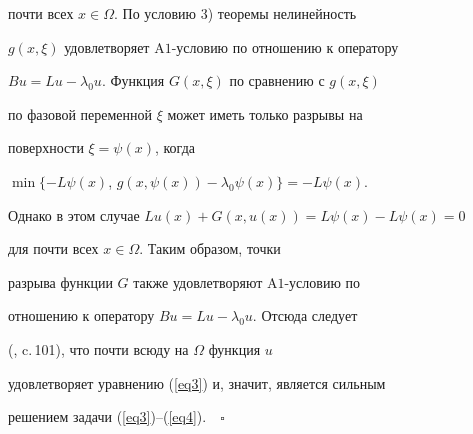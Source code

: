 почти всех $x\in\Omega$. По условию 3) теоремы нелинейность


$g(x,\xi)$ удовлетворяет  $\mathrm A1$-условию по отношению к оператору


$Bu=Lu-\lambda_0 u$. Функция $G(x,\xi)$ по сравнению с $g(x,\xi)$


по фазовой переменной $\xi$ может иметь только разрывы на


поверхности $\xi=\psi(x)$, когда


$\min\{-L\psi(x)$, $g(x,\psi(x))-\lambda_0\psi(x)\}=-L\psi(x)$.


Однако в этом случае $Lu(x)+G(x,u(x))=L\psi(x)-L\psi(x)=0$


для почти всех $x\in\Omega$. Таким образом, точки


разрыва функции $G$ также удовлетворяют $\mathrm A1$-условию по


отношению к оператору $Bu=Lu-\lambda_0 u$. Отсюда следует


(\cite{Pav4}, c.\,101), что почти всюду на $\Omega$ функция $u$


удовлетворяет уравнению (\ref{eq3}) и, значит, является сильным


решением задачи (\ref{eq3})--(\ref{eq4}).$\quad\square$








